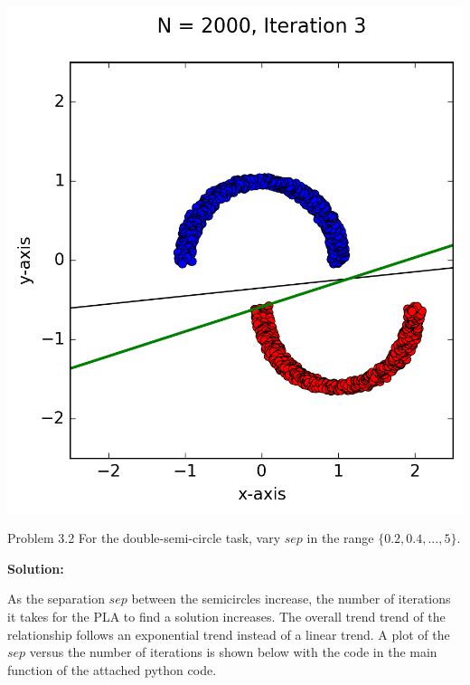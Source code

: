 \documentclass[a4paper]{article}
\begin{document}
\begin {description}
\begin{doublespace}
\begin{enumerate}[(a)]
\begin{center}
\includegraphics[scale=0.65]{Problem_3_1_c.png}
\end{center}

\end{enumerate}
\end{doublespace}

\item{Problem 3.2} For the double-semi-circle task, vary $sep$ in the range $\{0.2,0.4,...,5\}$.

\smallskip

\textbf{Solution:}
\begin{doublespace}
As the separation $sep$ between the semicircles increase, the number of iterations it takes for the PLA to find a solution increases. The overall trend trend of the relationship follows an exponential trend instead of a linear trend. A plot of the $sep$ versus the number of iterations is shown below with the code in the main function of the attached python code.


\end{doublespace}
\end{description}
\end{document}
